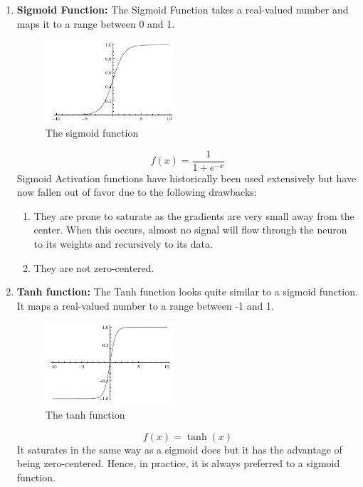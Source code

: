 \documentclass[twoside]{article}
\begin{document}
\begin{enumerate}

\item \textbf{Sigmoid Function:}
The Sigmoid Function takes a real-valued number and maps it to a range between 0 and 1.
\begin{figure}[!htb]
\centering
\includegraphics[height = 1.2in]{pics/sigmoid.jpeg}
\caption{The sigmoid function\cite{cs231n-website}}
\label{fig:sigmoid}
\end{figure}
\begin{equation*}
f(x) = \frac{1}{1+e^{-x}}
\end{equation*}
Sigmoid Activation functions have historically been used extensively but have now fallen out of favor due to the following drawbacks:
\begin{enumerate}
\item They are prone to saturate as the gradients are very small away from the center. When this occurs, almost no signal will flow through the neuron to its weights and recursively to its data.
\item They are not zero-centered.
\end{enumerate}

\item \textbf{Tanh function:}
The Tanh function looks quite similar to a sigmoid function. It maps a real-valued number to a range between -1 and 1.
\begin{figure}[!htb]
\centering
\includegraphics[height = 1.2in]{pics/tanh.jpeg}
\caption{The tanh function\cite{cs231n-website}}
\label{fig:tanh}
\end{figure}
\begin{equation*}
f(x) = \tanh(x)
\end{equation*}
It saturates in the same way as a sigmoid does but it has the advantage of being zero-centered. Hence, in practice, it is always preferred to a sigmoid function.
 

\end{enumerate}
\end{document}
